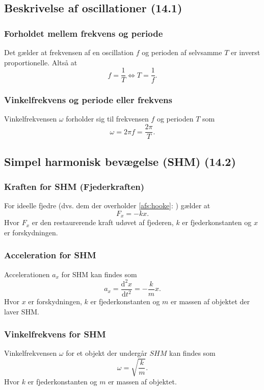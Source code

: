 \subsection{Beskrivelse af oscillationer (14.1)}

\subsubsection{Forholdet mellem frekvens og periode} \label{afs:frekper}
Det gælder at frekvensen af en oscillation $f$ og perioden af selvsamme $T$ er inverst proportionelle. Altså at
\[ 
f = \frac{1}{T} \iff T = \frac{1}{f}
.\]

\subsubsection{Vinkelfrekvens og periode eller frekvens} \label{afs:vinfrek}
Vinkelfrekvensen $\omega$ forholder sig til frekvensen $f$ og perioden $T$ som
\[ 
\omega = 2\pi f = \frac{2\pi}{T}
.\]


\subsection{Simpel harmonisk bevægelse (SHM) (14.2)}

\subsubsection{Kraften for SHM (Fjederkraften)} \label{afs:SHMkra}
For ideelle fjedre (dvs. dem der overholder \ref{afs:hooke}: ) gælder at 
\[ 
F_x = -kx
.\]
Hvor $F_x$ er den restaurerende kraft udøvet af fjederen, $k$ er fjederkonstanten og $x$ er forskydningen. 

\subsubsection{Acceleration for SHM} \label{afs:SHMacc}
Accelerationen $a_x$ for SHM kan findes som
\[ 
a_x = \frac{\mathrm{d}^2x}{\mathrm{d}t^2} = - \frac{k}{m}x
.\]
Hvor $x$ er forskydningen, $k$ er fjederkonstanten og $m$ er massen af objektet der laver SHM. 


\subsubsection{Vinkelfrekvens for SHM} \label{afs:SHMvinfrek}
Vinkelfrekvensen $\omega$ for et objekt der undergår $SHM$ kan findes som
\[ 
\omega = \sqrt{\frac{k}{m}}
.\]
Hvor $k$ er fjederkonstanten og $m$ er massen af objektet.


